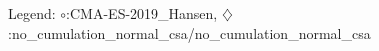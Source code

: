 Legend: {\color{CornflowerBlue}$\circ$}:CMA-ES-2019\_Hansen, {\color{Orange}$\diamondsuit$}:no\_cumulation\_normal\_csa/no\_cumulation\_normal\_csa